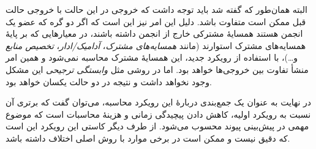 البته همان‌طور که گفته شد باید توجه داشت که خروجی در این حالت با خروجی حالت قبل ممکن است متفاوت باشد. دلیل این امر نیز این است که اگر دو گره که عضو یک انجمن هستند همسایهٔ مشترکی خارج از انجمن داشته باشند، در معیارهایی که بر پایهٔ همسایه‌های مشترک استوارند (مانند \textit{همسایه‌های مشترک}، \textit{آدامیک/ادار}، \textit{تخصیص منابع} و…)، با استفاده از رویکرد جدید، این همسایهٔ مشترک محاسبه نمی‌شود و همین امر منشأ تفاوت بین خروجی‌ها خواهد بود. اما در روشی مثل \textit{وابستگی ترجیحی} این مشکل وجود نخواهد داشت و نتیجه در دو حالت یکسان خواهد بود.

در نهایت به عنوان یک جمع‌بندی درباره‌ٔ این رویکرد محاسبه، می‌توان گفت که برتری آن نسبت به رویکرد اولیه، کاهش دادن پیچیدگی زمانی و هزینهٔ محاسبات است که موضوع مهمی در پیش‌بینی پیوند محسوب می‌شود. از طرف دیگر کاستی این رویکرد این است که دقیق نیست و ممکن است در برخی موارد با روش اصلی اختلاف داشته باشد.


